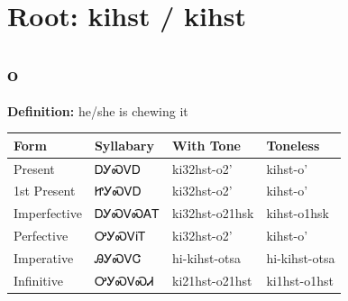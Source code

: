 \documentclass{article}%
\begin{document}
%
\normalsize%
\section*{Root: kihst / kihst}%
\subsection*{o}%
\textbf{Definition: }%
he/she is chewing it%
\\[0.5em]%
\begin{tabular}{|l|l|l|l|}%
\hline%
\textbf{Form}&\textbf{Syllabary}&\textbf{With Tone}&\textbf{Toneless}\\%
\hline%
Present&ᎠᎩᏍᏙᎠ&ki32hst{-}o2'&kihst{-}o'\\%
1st Present&ᏥᎩᏍᏙᎠ&ki32hst{-}o2'&kihst{-}o'\\%
Imperfective&ᎠᎩᏍᏙᏍᎪᎢ&ki32hst{-}o21hsk&kihst{-}o1hsk\\%
Perfective&ᎤᎩᏍᏙᎥᎢ&ki32hst{-}o2'&kihst{-}o'\\%
Imperative&ᎯᎩᏍᏙᏣ&hi{-}kihst{-}otsa&hi{-}kihst{-}otsa\\%
Infinitive&ᎤᎩᏍᏙᏍᏗ&ki21hst{-}o21hst&ki1hst{-}o1hst\\%
\hline%
\end{tabular}%
\\[1em]%
\end{document}
